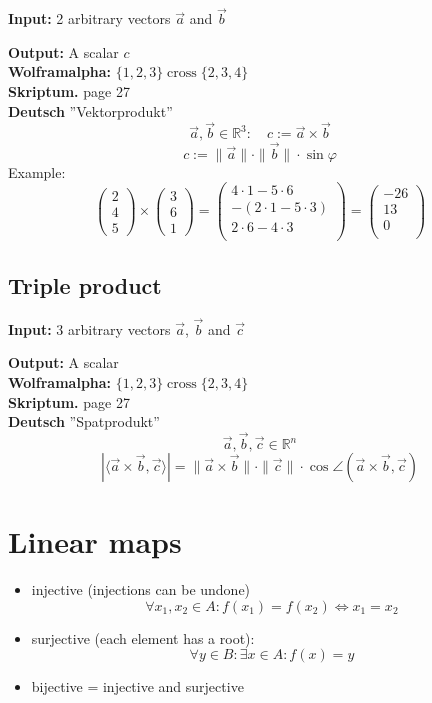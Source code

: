 \documentclass[a4paper,twocolumn]{article}
\newcommand{\io}[2]{{\par\noindent\textbf{Input:} #1 \\}{\textbf{Output:} #2 \\}}
\newcommand{\wa}[1]{\textbf{Wolframalpha:} $#1$ \\}
\newcommand{\scriptref}[1]{\textbf{Skriptum.} page #1 \\}
\newcommand{\dt}[1]{\textbf{Deutsch } #1 \\}
\begin{document}
\io{2 arbitrary vectors $\vec{a}$ and $\vec{b}$}{A scalar $c$}
\wa{\{1,2,3\} \operatorname{cross} \{2,3,4\}}
\scriptref{27}
\dt{''Vektorprodukt''}
%
\[
    \vec{a}, \vec{b}\in\mathbb{R}^3:
        \quad c := \vec{a}\times \vec{b}
\] \[
    c := \|\vec{a}\| \cdot \|\vec{b}\| \cdot \sin{\varphi}
\]
%
Example:
%
\[
    \begin{pmatrix} 2 \\ 4 \\ 5 \end{pmatrix}
        \times
    \begin{pmatrix} 3 \\ 6 \\ 1 \end{pmatrix}
    =
    \begin{pmatrix}
        4\cdot1 - 5\cdot6 \\
        -(2\cdot1 - 5\cdot3) \\
        2\cdot6 - 4\cdot3 \\
    \end{pmatrix}
    =
    \begin{pmatrix}
        -26 \\
        13 \\
        0 \\
    \end{pmatrix}
\]

\subsection{Triple product}

\io{3 arbitrary vectors $\vec{a}$, $\vec{b}$ and $\vec{c}$}{A scalar}
\wa{\{1,2,3\} \operatorname{cross} \{2,3,4\}}
\scriptref{27}
\dt{''Spatprodukt''}
%
\[
    \vec{a}, \vec{b}, \vec{c} \in \mathbb{R}^n
\] \[
    |\langle \vec{a}\times \vec{b}, \vec{c}\rangle|
        = \|\vec{a}\times \vec{b}\| \cdot \|\vec{c}\| \cdot
        \cos{\angle(\vec{a}\times \vec{b}, \vec{c})}
\]

\section{Linear maps}

\begin{itemize}
  \item injective (injections can be undone)
        \[
            \forall x_1, x_2 \in A: f(x_1) = f(x_2)
                \Leftrightarrow x_1 = x_2
        \]
  \item surjective (each element has a root):
        \[
            \forall y \in B: \exists x \in A:
                f(x) = y
        \]
  \item bijective = injective and surjective
\end{itemize}
\end{document}
